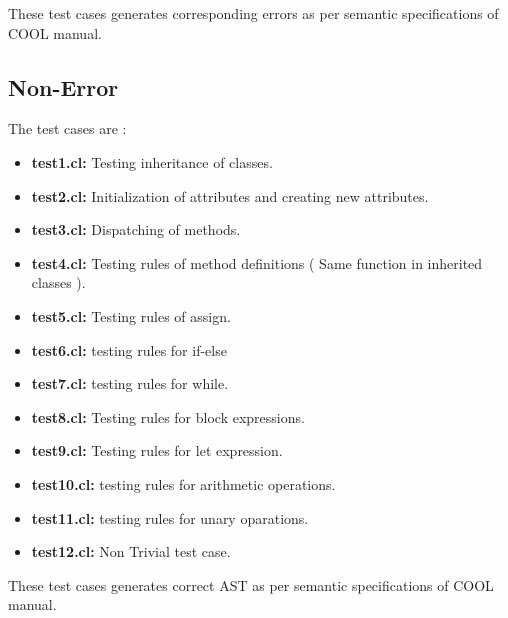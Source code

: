 \documentclass{article}
\begin{document}
These test cases generates corresponding errors as per semantic specifications of COOL manual.

\subsection{Non-Error}
The test cases are :
\begin{itemize}
    \item \textbf{test1.cl: }Testing inheritance of classes.
    \item \textbf{test2.cl: }Initialization of attributes and creating new attributes.
    \item \textbf{test3.cl: }Dispatching of methods.
    \item \textbf{test4.cl: }Testing rules of method definitions ( Same function in inherited classes ).
    \item \textbf{test5.cl: }Testing rules of assign.
    \item \textbf{test6.cl: }testing rules for if-else
    \item \textbf{test7.cl: }testing rules for while.
    \item \textbf{test8.cl: }Testing rules for block expressions.
    \item \textbf{test9.cl: }Testing rules for let expression.
    \item \textbf{test10.cl: }testing rules for arithmetic operations.
    \item \textbf{test11.cl: }testing rules for unary oparations.
    \item \textbf{test12.cl: }Non Trivial test case.
\end{itemize}
These test cases generates correct AST as per semantic specifications of COOL manual.

\vspace{300px}
\end{document}
